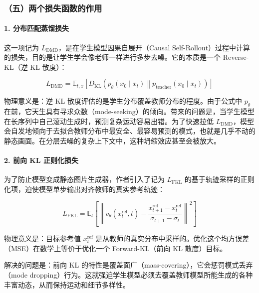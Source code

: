 \hypertarget{ux4e94ux4e24ux4e2aux635fux5931ux51fdux6570ux7684ux4f5cux7528}{%
\subsubsection{（五）两个损失函数的作用}\label{ux4e94ux4e24ux4e2aux635fux5931ux51fdux6570ux7684ux4f5cux7528}}

\hypertarget{ux5206ux5e03ux5339ux914dux84b8ux998fux635fux5931}{%
\paragraph{1. 分布匹配蒸馏损失}\label{ux5206ux5e03ux5339ux914dux84b8ux998fux635fux5931}}

这一项记为 \(L_{\mathrm{DMD}}\)，是在学生模型因果自展开（Causal Self-Rollout）过程中计算的损失，目的是让学生学会像老师一样进行多步去噪。它的本质是一个 Reverse-KL（逆 KL 散度）：

\[
L_{\mathrm{DMD}} =
\mathbb{E}_{t,x}
\left[
D_{\mathrm{KL}}\left(p_\theta(x_0\mid x_t)\middle\|p_{\mathrm{teacher}}(x_0\mid x_t)\right)
\right]
\]

物理意义是：逆 KL 散度评估的是学生分布覆盖教师分布的程度。由于公式中 \(p_\theta\) 在前，它天生具有寻求众数（mode-seeking）的倾向。带来的问题是，当学生模型在长序列中自己滚动生成时，预测复杂运动容易出错。为了快速拉低 \(L_{\mathrm{DMD}}\)，模型会自发地倾向于去拟合教师分布中最安全、最容易预测的模式，也就是几乎不动的静态画面。在分层去噪的复杂上下文中，这种坍缩效应甚至会被放大。

\hypertarget{ux524dux5411-kl-ux6b63ux5219ux5316ux635fux5931}{%
\paragraph{2. 前向 KL 正则化损失}\label{ux524dux5411-kl-ux6b63ux5219ux5316ux635fux5931}}

为了防止模型变成静态图片生成器，作者引入了记为 \(L_{\mathrm{FKL}}\) 的基于轨迹采样的正则化项，迫使模型单步输出对齐教师的真实参考轨迹：

\[
L_{\mathrm{FKL}} =
\mathbb{E}_{t}
\left[
\left\|
v_\theta(x_t^{\mathrm{ref}},t) -
\frac{x_{t+1}^{\mathrm{ref}}-x_t^{\mathrm{ref}}}{\sigma_{t+1}-\sigma_t}
\right\|^2
\right]
\]

物理意义是：目标参考值 \(x_t^{\mathrm{ref}}\) 是从教师的真实分布中采样的。优化这个均方误差（MSE）在数学上等价于优化一个 Forward-KL（前向 KL 散度）目标。

解决的问题是：前向 KL 的特性是覆盖面广（mass-covering），它会惩罚模式丢弃（mode dropping）行为。这就强迫学生模型必须去覆盖教师模型所能生成的各种丰富动态，从而保持运动和细节多样性。

